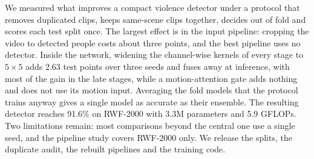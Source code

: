 \documentclass[runningheads]{llncs}
\begin{document}
We measured what improves a compact violence detector under a protocol that
removes duplicated clips, keeps same-scene clips together, decides out of
fold and scores each test split once. The largest effect is in the input
pipeline: cropping the video to detected people costs about three points,
and the best pipeline uses no detector. Inside the network, widening the
channel-wise kernels of every stage to $5\times5$ adds 2.63 test points
over three seeds and fuses away at inference, with most of the gain in the
late stages, while a motion-attention gate adds nothing and does not use
its motion input. Averaging the fold models that the protocol trains
anyway gives a single model as accurate as their ensemble. The resulting
detector reaches 91.6\% on RWF-2000 with 3.3M parameters and 5.9 GFLOPs.
Two limitations remain: most comparisons beyond the central one use a
single seed, and the pipeline study covers RWF-2000 only. We release the
splits, the duplicate audit, the rebuilt pipelines and the training code.



\end{document}

